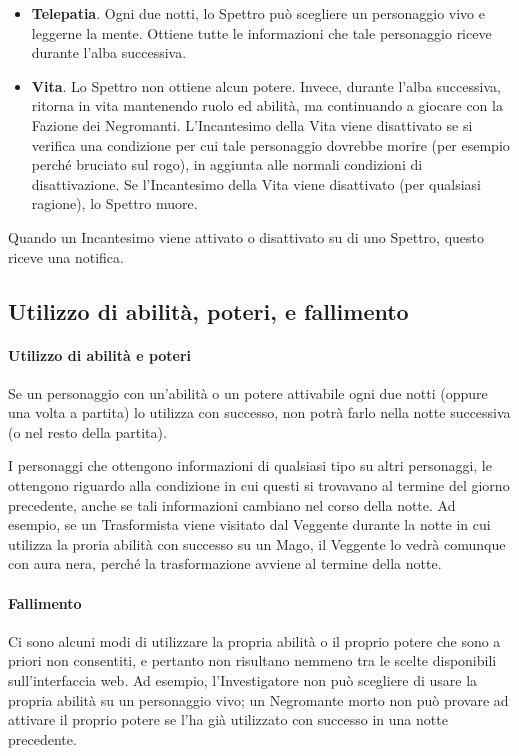 \documentclass[a4paper,10pt]{article}
\begin{document}
\begin{itemize}
	\item {\bf Telepatia}. Ogni due notti, lo Spettro può scegliere un personaggio vivo e leggerne la mente. Ottiene tutte le informazioni che tale personaggio riceve durante l'alba successiva.
	
	\item {\bf Vita}. Lo Spettro non ottiene alcun potere. Invece, durante l'alba successiva, ritorna in vita mantenendo ruolo ed abilità, ma continuando a giocare con la Fazione dei Negromanti.
	L'Incantesimo della Vita viene disattivato se si verifica una condizione per cui tale personaggio dovrebbe morire (per esempio perché bruciato sul rogo), in aggiunta alle normali condizioni di disattivazione.
	Se l'Incantesimo della Vita viene disattivato (per qualsiasi ragione), lo Spettro muore.
 
\end{itemize}

Quando un Incantesimo viene attivato o disattivato su di uno Spettro, questo riceve una notifica.

\subsection{Utilizzo di abilità, poteri, e fallimento}
\label{fallimento}

\paragraph{Utilizzo di abilità e poteri} 

Se un personaggio con un'abilità o un potere attivabile ogni due notti (oppure una volta a partita) lo utilizza con successo, non potrà farlo nella notte successiva (o nel resto della partita).

I personaggi che ottengono informazioni di qualsiasi tipo su altri personaggi, le ottengono riguardo alla condizione in cui questi si trovavano al termine del giorno precedente, anche se tali informazioni cambiano nel corso della notte.
Ad esempio, se un Trasformista viene visitato dal Veggente durante la notte in cui utilizza la proria abilità con successo su un Mago, il Veggente lo vedrà comunque con aura nera, perché la trasformazione avviene al termine della notte.

\paragraph{Fallimento} Ci sono alcuni modi di utilizzare la propria abilità o il proprio potere che sono a priori non consentiti, e pertanto non risultano nemmeno tra le scelte disponibili sull'interfaccia web. Ad esempio, l'Investigatore non può scegliere di usare la propria abilità su un personaggio vivo; un Negromante morto non può provare ad attivare il proprio potere se l'ha già utilizzato con successo in una notte precedente.
\end{document}
